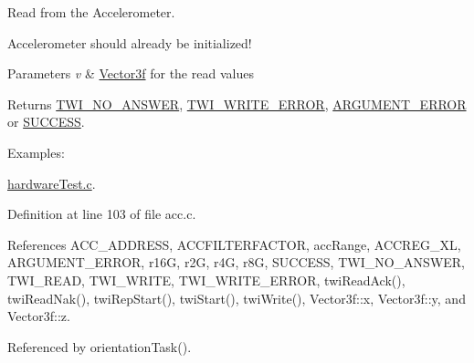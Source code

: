 Read from the Accelerometer. 

Accelerometer should already be initialized! 
\begin{DoxyParams}{Parameters}
{\em v} & \hyperlink{struct_vector3f}{Vector3f} for the read values \\
\hline
\end{DoxyParams}
\begin{DoxyReturn}{Returns}
\hyperlink{group__error_gga2c3e4bb40f36b262a5214e2da2bca9c5a04d5943ba652af2205c88b247e0c659c}{T\-W\-I\-\_\-\-N\-O\-\_\-\-A\-N\-S\-W\-E\-R}, \hyperlink{group__error_gga2c3e4bb40f36b262a5214e2da2bca9c5ac0e3b3463dcaf220e54794b4711708c9}{T\-W\-I\-\_\-\-W\-R\-I\-T\-E\-\_\-\-E\-R\-R\-O\-R}, \hyperlink{group__error_gga2c3e4bb40f36b262a5214e2da2bca9c5a49ccf277a69dd938c591928aa27c66cc}{A\-R\-G\-U\-M\-E\-N\-T\-\_\-\-E\-R\-R\-O\-R} or \hyperlink{group__error_gga2c3e4bb40f36b262a5214e2da2bca9c5ac7f69f7c9e5aea9b8f54cf02870e2bf8}{S\-U\-C\-C\-E\-S\-S}. 
\end{DoxyReturn}
\begin{Desc}
\item[Examples\-: ]\par
\hyperlink{hardware_test_8c-example}{hardware\-Test.\-c}.\end{Desc}


Definition at line 103 of file acc.\-c.



References A\-C\-C\-\_\-\-A\-D\-D\-R\-E\-S\-S, A\-C\-C\-F\-I\-L\-T\-E\-R\-F\-A\-C\-T\-O\-R, acc\-Range, A\-C\-C\-R\-E\-G\-\_\-\-X\-L, A\-R\-G\-U\-M\-E\-N\-T\-\_\-\-E\-R\-R\-O\-R, r16\-G, r2\-G, r4\-G, r8\-G, S\-U\-C\-C\-E\-S\-S, T\-W\-I\-\_\-\-N\-O\-\_\-\-A\-N\-S\-W\-E\-R, T\-W\-I\-\_\-\-R\-E\-A\-D, T\-W\-I\-\_\-\-W\-R\-I\-T\-E, T\-W\-I\-\_\-\-W\-R\-I\-T\-E\-\_\-\-E\-R\-R\-O\-R, twi\-Read\-Ack(), twi\-Read\-Nak(), twi\-Rep\-Start(), twi\-Start(), twi\-Write(), Vector3f\-::x, Vector3f\-::y, and Vector3f\-::z.



Referenced by orientation\-Task().


